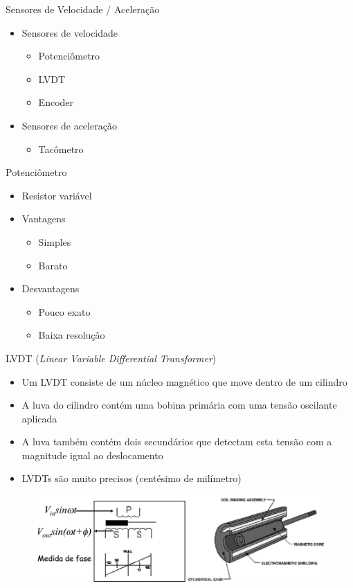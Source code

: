 \documentclass[aspectratio=169,
				xcolor=table]{beamer}
\begin{document}
		\begin{frame}{Sensores de Velocidade / Aceleração}
			\begin{itemize}
				\item Sensores de velocidade
				\begin{itemize}
					\item Potenciômetro
					\item LVDT
					\item Encoder			
				\end{itemize}
				\item Sensores de aceleração
				\begin{itemize}
					\item Tacômetro			
				\end{itemize}
			\end{itemize}
		\end{frame}
		
		\begin{frame}{Potenciômetro}
			\begin{itemize}
				\item Resistor variável
				\item Vantagens
				\begin{itemize}
					\item Simples
					\item Barato			
				\end{itemize}
				\item Desvantagens
				\begin{itemize}
					\item Pouco exato
					\item Baixa resolução			
				\end{itemize}
			\end{itemize}
		\end{frame}
		
		\begin{frame}{LVDT (\textit{Linear Variable Differential Transformer})}
			\begin{itemize}
				\item Um LVDT consiste de um núcleo magnético que move dentro de um cilindro
				\item A luva do cilindro contém uma bobina primária com uma tensão oscilante aplicada
				\item A luva também contém dois secundários que detectam esta tensão com a magnitude igual ao deslocamento
				\item LVDTs são muito precisos (centésimo de milímetro)
			\end{itemize}
			\begin{figure}
				\centering
				\includegraphics[scale=.35]{../figs/cap03/Imagem34}			
			\end{figure}
		\end{frame}
		
\end{document}
